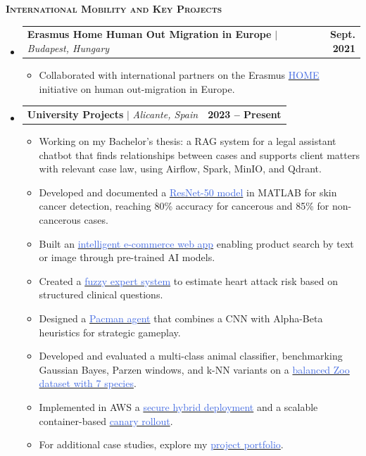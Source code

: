 \documentclass[letterpaper,11pt]{article}
\makeatletter
\newcommand{\resumeItem}[1]{
  \item\small{
    {#1 \vspace{-2pt}}
  }
}
\newcommand{\resumeProjectHeading}[2]{
    \item
    \begin{tabular*}{1.001\textwidth}{l@{\extracolsep{\fill}}r}
      \small#1 & \textbf{\small #2}\\
    \end{tabular*}\vspace{-7pt}
}
\newcommand{\bluehref}[2]{\href{#1}{\textcolor{RoyalBlue}{#2}}}
\newcommand{\resumeSubHeadingListStart}{\begin{itemize}[leftmargin=0.0in, label={}]}
\newcommand{\resumeSubHeadingListEnd}{\end{itemize}}
\newcommand{\resumeItemListStart}{\begin{itemize}}
\newcommand{\resumeItemListEnd}{\end{itemize}\vspace{-3pt}}
\newenvironment{resumeSection}[1]{
  \begin{tcolorbox}[
    colback=white,
    boxrule=0pt,
    sharp corners,
    enhanced,
    breakable,
    left=4pt,
    right=4pt,
    top=4pt,
    bottom=4pt,
    borderline west={0.6pt}{0pt}{black},
    borderline east={0.6pt}{0pt}{black},
    borderline north={0.6pt}{0pt}{black},
    borderline south={0.6pt}{0pt}{black}
  ]
  {\scshape\large\bfseries #1}\par\vspace{1pt}
}{
  \end{tcolorbox}
  \vspace{-2pt}
}
\makeatother
\begin{document}
\begin{resumeSection}{International Mobility and Key Projects}
  \resumeSubHeadingListStart
    \resumeProjectHeading
      {\textbf{Erasmus Home Human Out Migration in Europe} $|$ \emph{Budapest, Hungary}}{Sept. 2021}
      \resumeItemListStart
        \resumeItem{Collaborated with international partners on the Erasmus \bluehref{https://erasmus-plus.ec.europa.eu/projects/search/details/2020-1-FR01-KA229-079855}{HOME} initiative on human out-migration in Europe.}
      \resumeItemListEnd
    \resumeProjectHeading
      {\textbf{University Projects} $|$ \emph{Alicante, Spain}}{2023 -- Present}
      \resumeItemListStart
  \resumeItem{Working on my Bachelor's thesis: a RAG system for a legal assistant chatbot that finds relationships between cases and supports client matters with relevant case law, using Airflow, Spark, MinIO, and Qdrant.}
  \resumeItem{Developed and documented a \bluehref{https://github.com/JBLOZ/CNN-classification----geometric2d-and-cancer-dangerousness}{ResNet-50 model} in MATLAB for skin cancer detection, reaching 80\% accuracy for cancerous and 85\% for non-cancerous cases.}
  \resumeItem{Built an \bluehref{https://github.com/JBLOZ/py-ecommerce-software-proyect}{intelligent e-commerce web app} enabling product search by text or image through pre-trained AI models.}
  \resumeItem{Created a \bluehref{https://github.com/JBLOZ/heart-attack-fuzzy-system}{fuzzy expert system} to estimate heart attack risk based on structured clinical questions.}
  \resumeItem{Designed a \bluehref{https://jbloz.github.io/portfolio/proyectos/PACMAN-CNN-Alphabeta/memoria.pdf}{Pacman agent} that combines a CNN with Alpha-Beta heuristics for strategic gameplay.}
  \resumeItem{Developed and evaluated a multi-class animal classifier, benchmarking Gaussian Bayes, Parzen windows, and k-NN variants on a \bluehref{https://jbloz.github.io/portfolio/proyectos/aprendizaje_automatico/p_02/memoria.pdf}{balanced Zoo dataset with 7 species}.}
  \resumeItem{Implemented in AWS a \bluehref{https://jbloz.github.io/portfolio/proyectos/aws/p_03/memoria_03.pdf}{secure hybrid deployment} and a scalable container-based \bluehref{https://jbloz.github.io/portfolio/proyectos/aws/p_04/memoria_04.pdf}{canary rollout}.}
  \resumeItem{For additional case studies, explore my \bluehref{https://jbloz.github.io/portfolio}{project portfolio}.}
      \resumeItemListEnd
  \resumeSubHeadingListEnd
\end{resumeSection}
\end{document}
